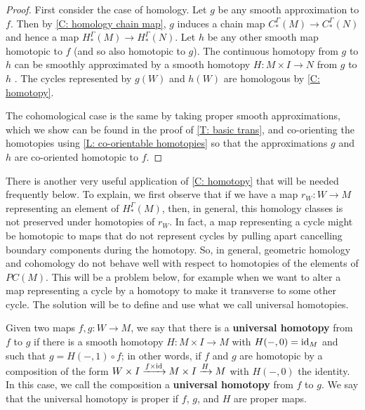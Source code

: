 \begin{proof}
	First consider the case of homology.
	Let $g$ be any smooth approximation to $f$.
	Then by \cref{C: homology chain map}, $g$ induces a chain map $C_*^\Gamma(M) \to C_*^\Gamma(N)$ and hence a map $H_*^\Gamma(M) \to H_*^\Gamma(N)$.
	Let $h$ be any other smooth map homotopic to $f$ (and so also homotopic to $g$).
	The continuous homotopy from $g$ to $h$ can be smoothly approximated by a smooth homotopy $H \colon M \times I \to N$ from $g$ to $h$ \cite[Theorem III.2.5]{Kos93}.
	The cycles represented by $g(W)$ and $h(W)$ are homologous by \cref{C: homotopy}.

	The cohomological case is the same by taking proper smooth approximations, which we show can be found in the proof of \cref{T: basic trans}, and co-orienting the homotopies using \cref{L: co-orientable homotopies} so that the approximations $g$ and $h$ are co-oriented homotopic to $f$.
\end{proof}



There is another very useful application of \cref{C: homotopy} that will be needed frequently below.
To explain, we first observe that if we have a map $r_W \colon W \to M$ representing an element of $H_*^\Gamma(M)$, then, in general, this homology classes is not preserved under homotopies of $r_W$.
In fact, a map representing a cycle might be homotopic to maps that do not represent cycles by pulling apart cancelling boundary components during the homotopy.
So, in general, geometric homology and cohomology do not behave well with respect to homotopies of the elements of $PC(M)$.
This will be a problem below, for example when we want to alter a map representing a cycle by a homotopy to make it transverse to some other cycle.
The solution will be to define and use what we call universal homotopies.


\begin{definition}\label{D: universal homotopy}
Given two maps $f,g \colon W\to M$, we say that there is a \textbf{universal homotopy} from $f$ to $g$ if there is a smooth homotopy $H \colon M\times I\to M$ with $H(-,0)=\mathrm{id}_M$ and such that $g=H(-,1)\circ f$; in other words, if  $f$ and $g$ are homotopic by a  composition of the form  $W \times I \xrightarrow{f\times \mathrm{id}} M \times I \xrightarrow{H} M$ with $H(-,0)$ the identity. In this case, we call the composition a \textbf{universal homotopy} from $f$ to $g$. We say that the universal homotopy is proper if $f$, $g$, and $H$ are proper maps.
\end{definition}


